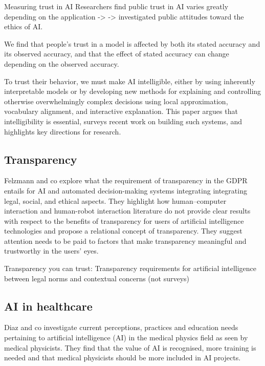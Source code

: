\documentclass[manuscript,screen,review]{acmart}
\begin{document}
Measuring trust in AI
Researchers find public trust in AI varies greatly depending on the application -> %
-> investigated public attitudes toward the ethics of AI.

We find that people's trust in a model is affected by both its stated accuracy and its observed accuracy, and that the effect of stated accuracy can change depending on the observed accuracy\cite{Yin2019}.

To trust their behavior, we must make AI intelligible, either by using inherently interpretable models or by developing new methods for explaining and controlling otherwise overwhelmingly complex decisions using local approximation, vocabulary alignment, and interactive explanation.
This paper argues that intelligibility is essential, surveys recent work on building such systems, and highlights key directions for research\cite{Weld2019}.

\subsection{Transparency}\label{subsec:transparency}
Felzmann and co explore what the requirement of transparency in the GDPR entails for AI and automated decision-making systems integrating integrating legal, social, and ethical aspects.
They highlight how human–computer interaction and human-robot interaction literature do not provide clear results with respect to the benefits of transparency for users of artificial intelligence technologies
and propose a relational concept of transparency. They suggest attention needs to be paid to factors that make transparency meaningful and trustworthy in the users’ eyes.\cite{Felzmann2019}

Transparency you can trust: Transparency requirements for artificial intelligence between legal norms and contextual concerns (not surveys)\cite{Markus2021}

\subsection{AI in healthcare}\label{subsec:ai-in-healthcare}
Diaz and co investigate current perceptions, practices and education needs pertaining to artificial intelligence (AI) in the medical physics field as seen by medical physicists.
They find that the value of AI is recognised, more training is needed and that medical physicists should be more included in AI projects.\cite{Diaz2021}
\end{document}
